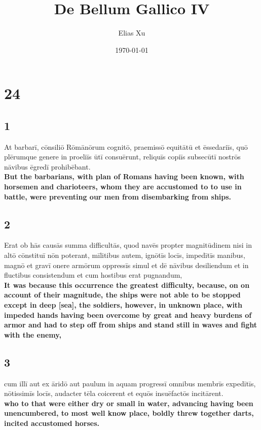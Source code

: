 \documentclass{article}
\begin{document}
\title{De Bellum Gallico IV}
\author{Elias Xu}
\date{\today}
\maketitle

\setlength{\parindent}{0pt}

\section*{24}

\subsection*{1}
At barbarī, cōnsiliō Rōmānōrum cognitō, praemissō equitātū et ēssedariīs, quō plērumque genere in proeliīs ūtī consuērunt, reliquīs copiīs subsecūtī nostrōs nāvibus ēgredī prohibēbant.  \\
\textbf{But the barbarians, with plan of Romans having been known, with horsemen and charioteers, whom they are accustomed to to use in battle, were preventing our men from disembarking from ships.}

\subsection*{2}
Erat ob hās causās summa difficultās, quod navēs propter magnitūdinem nisi in altō cōnstituī nōn poterant, mīlitibus autem, ignōtīs locīs, impedītīs manibus, magnō et gravī onere armōrum oppressīs simul et dē nāvibus desiliendum et in fluctibus consistendum et cum hostibus erat pugnandum,  \\
\textbf{It was because this occurrence the greatest difficulty, because, on on account of their magnitude, the ships were not able to be stopped except in deep [sea], the soldiers, however, in unknown place, with impeded hands having been overcome by great and heavy burdens of armor and had to step off from ships and stand still in waves and fight with the enemy,}

\subsection*{3}
cum illī aut ex āridō aut paulum in aquam progressī omnibus membrīs expedītīs, nōtissimīs locīs, audacter tēla coicerent et equōs insuēfactōs incitārent.  \\
\textbf{who to that were either dry or small in water, advancing having been unencumbered, to most well know place, boldly threw together darts, incited accustomed horses.}
\end{document}
